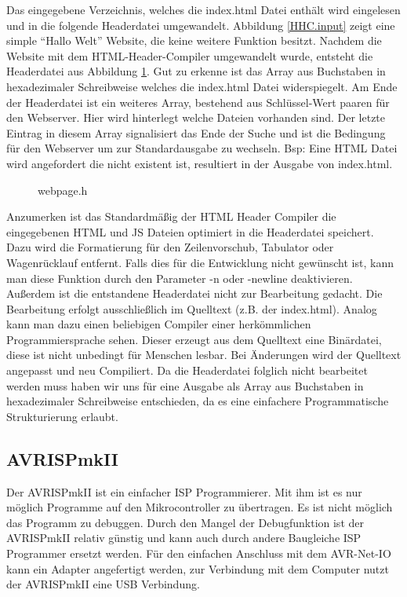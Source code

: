 Das eingegebene Verzeichnis, welches die \textrm{index.html} Datei enthält wird
eingelesen und in die folgende Headerdatei umgewandelt.
Abbildung \ref{HHC.input} zeigt eine simple "`Hallo Welt"' Website, die keine
weitere Funktion besitzt. Nachdem die Website mit dem HTML-Header-Compiler
umgewandelt wurde, entsteht die Headerdatei aus Abbildung \ref{HHC.output}. Gut
zu erkenne ist das Array aus Buchstaben in hexadezimaler Schreibweise welches die
index.html Datei widerspiegelt.
Am Ende der Headerdatei ist ein weiteres Array, bestehend aus Schlüssel-Wert
paaren für den Webserver. Hier wird hinterlegt welche Dateien vorhanden sind.
Der letzte Eintrag in diesem Array signalisiert das Ende der Suche und ist die
Bedingung für den Webserver um zur Standardausgabe zu wechseln. Bsp: Eine HTML
Datei wird angefordert die nicht existent ist, resultiert in der Ausgabe von
index.html.

\begin{figure}[H]

\caption{webpage.h}
\label{HHC.output}
\end{figure}

Anzumerken ist das Standardmäßig der HTML Header Compiler die eingegebenen HTML
und JS Dateien optimiert in die Headerdatei speichert. Dazu wird die
Formatierung für den Zeilenvorschub, Tabulator oder Wagenrücklauf entfernt.
Falls dies für die Entwicklung nicht gewünscht ist, kann man diese Funktion
durch den Parameter \textrm{-n oder -newline} deaktivieren.
Außerdem ist die entstandene Headerdatei nicht zur Bearbeitung gedacht. Die
Bearbeitung erfolgt ausschließlich im Quelltext (z.B. der index.html). Analog
kann man dazu einen beliebigen Compiler einer herkömmlichen Programmiersprache sehen. Dieser
erzeugt aus dem Quelltext eine Binärdatei, diese ist nicht unbedingt
für Menschen lesbar. Bei Änderungen wird der Quelltext angepasst und neu
Compiliert. Da die Headerdatei folglich nicht bearbeitet werden muss haben wir
uns für eine Ausgabe als Array aus Buchstaben in hexadezimaler Schreibweise
entschieden, da es eine einfachere Programmatische Strukturierung erlaubt.

\subsection{AVRISPmkII}

Der AVRISPmkII ist ein einfacher \ac{ISP} Programmierer. Mit ihm ist es nur
möglich Programme auf den Mikrocontroller zu übertragen. Es ist nicht möglich
das Programm zu debuggen. Durch den Mangel der Debugfunktion ist der AVRISPmkII
relativ günstig und kann auch durch andere Baugleiche \ac{ISP} Programmer ersetzt
werden. Für den einfachen Anschluss mit dem AVR-Net-IO kann ein Adapter
angefertigt werden, zur Verbindung mit dem Computer nutzt der AVRISPmkII eine
USB Verbindung.

